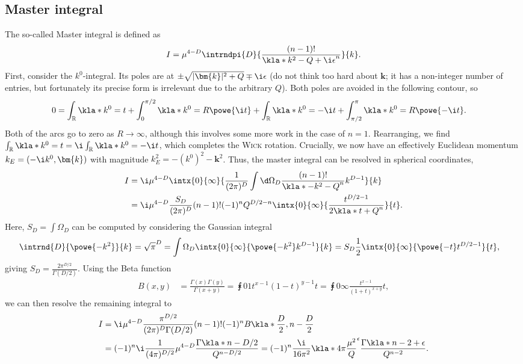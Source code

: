\documentclass[english, parskip=full]{scrbook}
\begin{document}
\subsection{Master integral}
The so-called Master integral is defined as
\begin{align}
I=\mu^{4-D}\intrndpi{D}{\frac{(n-1)!}{\kla*{k^2-Q+\i\epsilon}^n}}{k}.
\end{align}
First, consider the $k^0$-integral.
Its poles are at $\pm\sqrt{|\bm{k}|^2+Q}\mp\i\epsilon$ (do not think too hard about $\bm{k}$; it has a non-integer number of entries, but fortunately its precise form is irrelevant due to the arbitrary $Q$).
Both poles are avoided in the following contour, so
\begin{align}
0 &= \int_{\mathbb{R}} \kla*{k^0=t} + \int_0^{\pi/2} \kla*{k^0=R\powe{\i t}} + \int_{\mathbb{R}} \kla*{k^0=-\i t} + \int_{\pi/2}^\pi \kla*{k^0=R\powe{-\i t}}.
\end{align}
Both of the arcs go to zero as $R\rightarrow\infty$, although this involves some more work in the case of $n=1$.
Rearranging, we find $\int_{\mathbb{R}} \kla*{k^0=t} = \i\int_{\mathbb{R}} \kla*{k^0=-\i t}$, which completes the \textsc{Wick} rotation.
Crucially, we now have an effectively Euclidean momentum $k_E=(-\i k^0,\bm{k})$ with magnitude $k_E^2=-(k^0)^2-\bm{k}^2$.
Thus, the master integral can be resolved in spherical coordinates,
\begin{align}
I &= \i\mu^{4-D} \intx{0}{\infty}{ \frac{1}{(2\pi)^D} \int\d\Omega_D \frac{(n-1)!}{\kla*{-k^2-Q}^n} k^{D-1} }{k} \\
&= \i\mu^{4-D}\frac{S_D}{(2\pi)^D}(n-1)!(-1)^n Q^{D/2-n} \intx{0}{\infty}{\frac{t^{D/2-1}}{2\kla*{t+Q}^n}}{t}.
\end{align}
Here, $S_D=\int\Omega_D$ can be computed by considering the Gaussian integral
\begin{align}
\intrnd{D}{\powe{-k^2}}{k} &= \sqrt{\pi}^D = \int\Omega_D \intx{0}{\infty}{\powe{-k^2} k^{D-1}}{k} = S_D \frac{1}{2}\intx{0}{\infty}{\powe{-t} t^{D/2-1}}{t},
\end{align}
giving $S_D = \frac{2\pi^{D/2}}{\Gamma(D/2)}$.
Using the Beta function
\begin{align}
B(x,y) &= \frac{\Gamma(x)\Gamma(y)}{\Gamma(x+y)} = \intx{0}{1}{t^{x-1}(1-t)^{y-1}}{t} = \intx{0}{\infty}{\frac{t^{x-1}}{(1+t)^{x+y}}}{t}, %
\end{align}
we can then resolve the remaining integral to
\begin{align}
I &= \i\mu^{4-D}\frac{\pi^{D/2}}{(2\pi)^D \Gamma(D/2)}(n-1)!(-1)^n B\kla*{\frac{D}{2}, n-\frac{D}{2}} \\
&= (-1)^n \i \frac{1}{(4\pi)^{D/2}} \mu^{4-D} \frac{\Gamma\kla*{n-D/2}}{Q^{n-D/2}} = (-1)^n \frac{\i}{16\pi^2} \kla*{4\pi\frac{\mu^2}{Q}}^\epsilon \frac{\Gamma\kla*{n-2+\epsilon}}{Q^{n-2}}.
\end{align}
\end{document}

